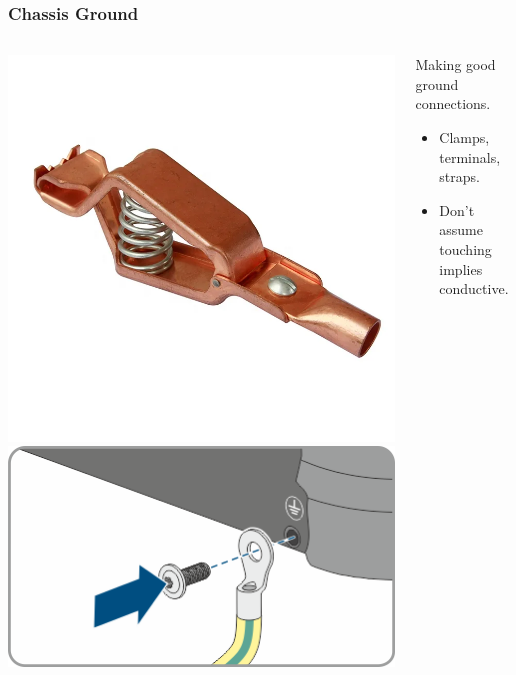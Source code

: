 \documentclass{presentation}
\begin{document}
\begin{frame}\frametitle{Chassis Ground}
  \begin{columns}
    \begin{column}{0.3\textwidth}
      \includegraphics[width=\textwidth]{"./clamp.png"}
      \includegraphics[width=\textwidth]{"./stud.png"}
    \end{column}
    \begin{column}{0.7\textwidth}
      Making good ground connections.
      \begin{itemize}
        \item Clamps, terminals, straps.
        \item Don't assume touching implies conductive.
      \end{itemize}
    \end{column}
  \end{columns}
\end{frame}
\end{document}
